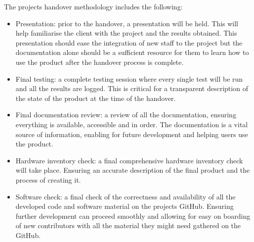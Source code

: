 The projects handover methodology includes the following:
\begin{itemize}
    \item Presentation: prior to the handover, a presentation will be held. This will help familiarise the client with the project and the results obtained. This presentation should ease the integration of new staff to the project but the documentation alone should be a sufficient resource for them to learn how to use the product after the handover process is complete.
    \item Final testing: a complete testing session where every single test will be run and all the results are logged. This is critical for a transparent description of the state of the product at the time of the handover.
    \item Final documentation review: a review of all the documentation, ensuring everything is available, accessible and in order. The documentation is a vital source of information, enabling for future development and helping users use the product.
    \item Hardware inventory check: a final comprehensive hardware inventory check will take place. Ensuring an accurate description of the final product and the process of creating it.
    \item Software check: a final check of the correctness and availability of all the developed code and software material on the projects GitHub. Ensuring further development can proceed smoothly and allowing for easy on boarding of new contributors with all the material they might need gathered on the GitHub.
\end{itemize}

\begin{comment}
The handover will be structured, clear and simple to follow ensuring easy accessibility to the stakeholders. \\
The handover methodology is will take form of: \\
{* Canvas:} Handing in the final project report.\\  
{* GitHub:} Handing in all code, documentation, issues, bugs and all other project files.\\ 
{* Overleaf:} Will be used for the final project report. \\ 

Handover will also include all necessary documentation, such as user manuals, system design, API references and test results. 
\end{comment}

